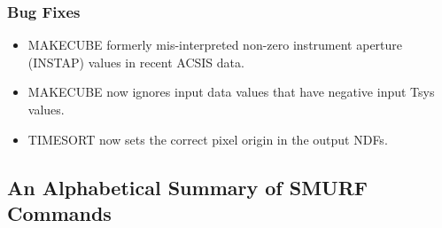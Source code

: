 \documentclass[twoside,11pt]{article}
\newcommand{\xlabel}[1]{}
\renewcommand{\_}{\texttt{\symbol{95}}}
\begin{document}
\subsubsection*{Bug Fixes}

\begin{itemize}
\item MAKECUBE formerly mis-interpreted non-zero instrument aperture (INSTAP) values in recent ACSIS data.
\item MAKECUBE now ignores input data values that have negative input Tsys values.
\item TIMESORT now sets the correct pixel origin in the output NDFs.
\end{itemize}

\newpage
\appendix
\begin{small}
\section{\xlabel{ap_summary}An Alphabetical Summary of SMURF Commands
\label{ap:summary}}
\begin{htmlonly}
\begin{description}
\end{htmlonly}


\end{small}
\end{document}
